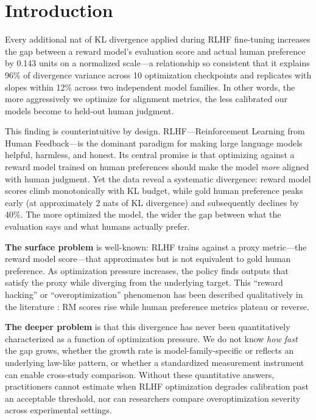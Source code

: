 \section{Introduction}

Every additional nat of KL divergence applied during RLHF fine-tuning increases the gap between a reward model's evaluation score and actual human preference by 0.143 units on a normalized scale---a relationship so consistent that it explains 96\% of divergence variance across 10 optimization checkpoints and replicates with slopes within 12\% across two independent model families. In other words, the more aggressively we optimize for alignment metrics, the less calibrated our models become to held-out human judgment.

This finding is counterintuitive by design. RLHF---Reinforcement Learning from Human Feedback---is the dominant paradigm for making large language models helpful, harmless, and honest. Its central promise is that optimizing against a reward model trained on human preferences should make the model \emph{more} aligned with human judgment. Yet the data reveal a systematic divergence: reward model scores climb monotonically with KL budget, while gold human preference peaks early (at approximately 2 nats of KL divergence) and subsequently declines by 40\%. The more optimized the model, the wider the gap between what the evaluation says and what humans actually prefer.

\textbf{The surface problem} is well-known: RLHF trains against a proxy metric---the reward model score---that approximates but is not equivalent to gold human preference. As optimization pressure increases, the policy finds outputs that satisfy the proxy while diverging from the underlying target. This ``reward hacking'' or ``overoptimization'' phenomenon has been described qualitatively in the literature \cite{Coste2023Reward,Gao2023Scaling}: RM scores rise while human preference metrics plateau or reverse.

\textbf{The deeper problem} is that this divergence has never been quantitatively characterized as a function of optimization pressure. We do not know \emph{how fast} the gap grows, whether the growth rate is model-family-specific or reflects an underlying law-like pattern, or whether a standardized measurement instrument can enable cross-study comparison. Without these quantitative answers, practitioners cannot estimate when RLHF optimization degrades calibration past an acceptable threshold, nor can researchers compare overoptimization severity across experimental settings.

